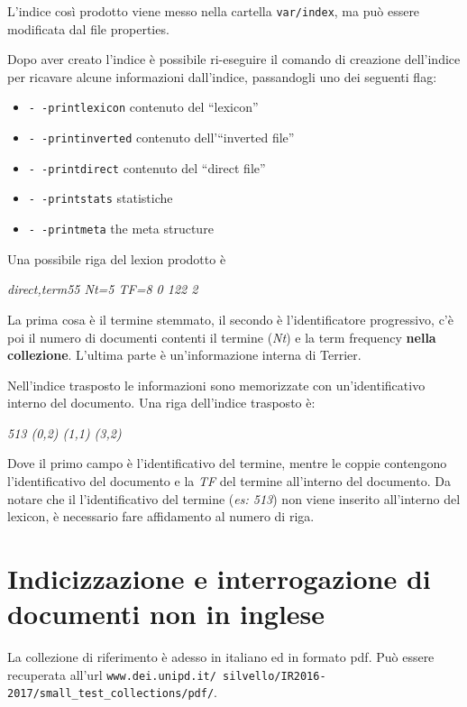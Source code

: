 \noindent L'indice così prodotto viene messo nella cartella \texttt{var/index}, ma può essere modificata dal file properties.

Dopo aver creato l'indice è possibile ri-eseguire il comando di creazione dell'indice per ricavare alcune informazioni dall'indice, passandogli uno dei seguenti flag:

\begin{itemize}
	\item \texttt{- -printlexicon} contenuto del ``lexicon''
	\item \texttt{- -printinverted} contenuto dell'``inverted file''
	\item \texttt{- -printdirect} contenuto del ``direct file''
	\item \texttt{- -printstats} statistiche
	\item \texttt{- -printmeta} the meta structure
\end{itemize}

\noindent Una possibile riga del lexion prodotto è

\begin{center}
	\textit{direct,term55 Nt=5 TF=8 \@{0 122 2}}
\end{center}

\noindent La prima cosa è il termine stemmato, il secondo è l'identificatore progressivo, c'è poi il numero di documenti contenti il termine (\textit{Nt}) e la term frequency \textbf{nella collezione}. L'ultima parte è un'informazione interna di Terrier.

Nell'indice trasposto le informazioni sono memorizzate con un'identificativo interno del documento.
Una riga dell'indice trasposto è:

\begin{center}
	\textit{513 (0,2) (1,1) (3,2)}
\end{center}

\noindent Dove il primo campo è l'identificativo del termine, mentre le coppie contengono l'identificativo del documento e la \textit{TF} del termine all'interno del documento.
Da notare che il l'identificativo del termine (\textit{es: 513}) non viene inserito all'interno del lexicon, è necessario fare affidamento al numero di riga.

\section{Indicizzazione e interrogazione di documenti non in inglese}

La collezione di riferimento è adesso in italiano ed in formato pdf. Può essere recuperata all'url \texttt{www.dei.unipd.it/~silvello/IR2016-2017/small\_test\_collections/pdf/}.

